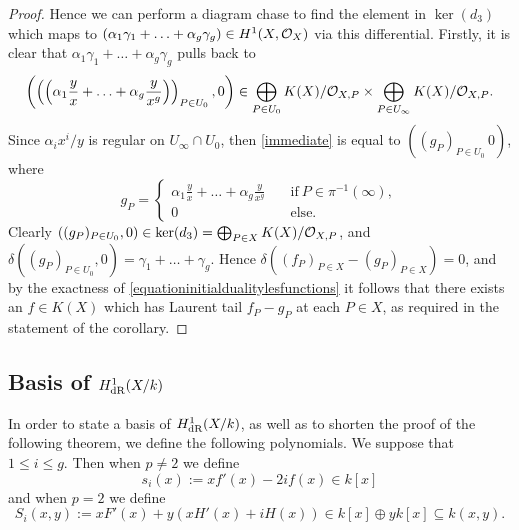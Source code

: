 \begin{proof}
    Hence we can perform a diagram chase to find the element in $\ker(d_3)$ which maps to $\left( \alpha_1\gamma_1 + \ldots + \alpha_g\gamma_g \right) \in H^1(X,\mathcal{O}_X)$ via this differential.
    Firstly, it is clear that $\alpha_1\gamma_1 + \ldots + \alpha_g\gamma_g$ pulls back to 
        \begin{equation}\label{immediate}
        \left( \left(\left( \alpha_1\frac{y}{x} + \ldots + \alpha_g\frac{y}{x^g} \right) \right)_{P \in U_0}, 0\right) \in \bigoplus_{P \in U_0}K(X)/{\cal O}_{X,P} \times \bigoplus_{P \in U_\infty}K(X)/{\cal O}_{X,P}.
        \end{equation}
    Since $\alpha_ix^i/y$ is regular on $U_\infty \cap U_0$, then \eqref{immediate} is equal to $\left( (g_P)_{P \in U_0}\, 0\right)$, where
        \[
        g_P =
            \begin{cases}
            \alpha_1\frac{y}{x} + \ldots + \alpha_g\frac{y}{x^g} & \quad \text{if}\ P \in \pi^{-1}(\infty), \\
            0 & \quad \text{else.}
            \end{cases}
        \]
    Clearly $\left( (g_P)_{P \in U_0},0\right) \in \ker (d_3) = \bigoplus_{P \in X} K(X)/{\cal O}_{X,P}$, and $\delta \left( (g_P)_{P \in U_0}, 0 \right) = \gamma_1 + \ldots + \gamma_g$.
    Hence $\delta((f_P)_{P \in X} - (g_P)_{P \in X}) = 0$, and by the exactness of \eqref{equationinitialdualitylesfunctions} it follows that there exists an $f \in K(X)$ which has Laurent tail $f_P - g_P$ at each $P \in X$, as required in the statement of the corollary.
    \end{proof}

\subsection{Basis of $H^1_{\rm dR}(X/k)$}

In order to state a basis of $H_{\text {dR}}^1(X/k)$, as well as to shorten the proof of the following theorem, we define the following polynomials. 
We suppose that $1 \leq i \leq g$.
Then when $p\neq 2$ we define
    \[
    s_i(x) := xf'(x) - 2if(x) \in k[x]
    \]
and when $p = 2$ we define
    \begin{equation}\label{equationSi}
    S_i(x,y) := xF'(x) + y(xH'(x) + iH(x))\in k[x]\oplus yk[x] \subseteq k(x,y).
    \end{equation}


